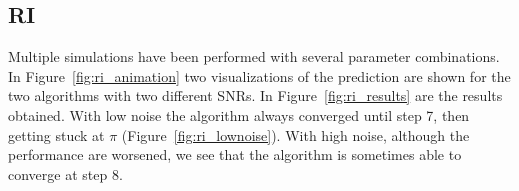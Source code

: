 \documentclass{article}
\begin{document}
\subsection{RI}


Multiple simulations have been performed with several parameter combinations. In Figure~\ref{fig:ri_animation} two visualizations of the prediction are shown for the two algorithms with two different SNRs. In Figure~\ref{fig:ri_results} are the results obtained. With low noise the algorithm always converged until step 7, then getting stuck at $\pi$ (Figure~\ref{fig:ri_lownoise}). With high noise, although the performance are worsened, we see that the algorithm is sometimes able to converge at step 8. 

\medskip
 
\printbibliography
\end{document}
